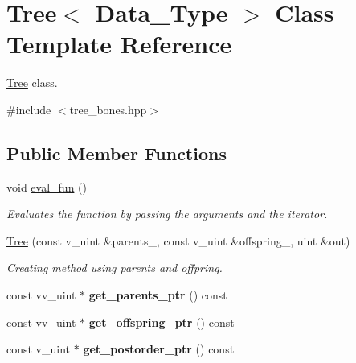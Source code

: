 \hypertarget{classTree}{}\section{Tree$<$ Data\+\_\+\+Type $>$ Class Template Reference}
\label{classTree}


\hyperlink{classTree}{Tree} class.  




{\ttfamily \#include $<$tree\+\_\+bones.\+hpp$>$}

\subsection*{Public Member Functions}
\begin{DoxyCompactItemize}
\item 
\mbox{\label{classTree_a8594d2b0497b06d77201545e0cece3d3}} 
void \hyperlink{classTree_a8594d2b0497b06d77201545e0cece3d3}{eval\+\_\+fun} ()
\begin{DoxyCompactList}\small\item\em Evaluates the function by passing the arguments and the iterator. \end{DoxyCompactList}\item 
\hyperlink{classTree_a792b1c2d2a658a43a1c9098514c7b193}{Tree} (const v\+\_\+uint \&parents\+\_\+, const v\+\_\+uint \&offspring\+\_\+, uint \&out)
\begin{DoxyCompactList}\small\item\em Creating method using parents and offpring. \end{DoxyCompactList}\item 
\mbox{\label{classTree_a08cc767cc4a7bfb9ee1ed629ae5c8304}} 
const vv\+\_\+uint $\ast$ {\bfseries get\+\_\+parents\+\_\+ptr} () const
\item 
\mbox{\label{classTree_ac56985f0401da84ae095f42c7fed1c95}} 
const vv\+\_\+uint $\ast$ {\bfseries get\+\_\+offspring\+\_\+ptr} () const
\item 
\mbox{\label{classTree_aa37a9d9d9456dd0f3fc7895ea3c3d722}} 
const v\+\_\+uint $\ast$ {\bfseries get\+\_\+postorder\+\_\+ptr} () const
\item 
\mbox{\label{classTree_a656d5e4749271a9c7de613ba65b7743f}} 

\end{DoxyCompactItemize}
